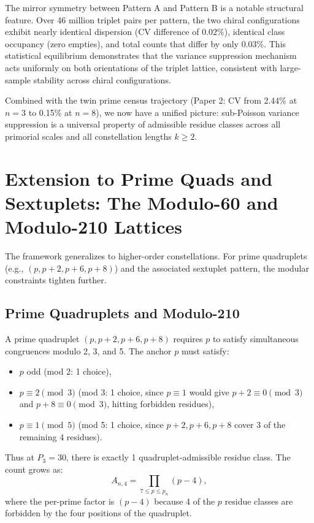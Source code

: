 \documentclass[11pt]{article}
\begin{document}
The mirror symmetry between Pattern A and Pattern B is a notable structural feature. Over 46 million triplet pairs per pattern, the two chiral configurations exhibit nearly identical dispersion (CV difference of $0.02\%$), identical class occupancy (zero empties), and total counts that differ by only $0.03\%$. This statistical equilibrium demonstrates that the variance suppression mechanism acts uniformly on both orientations of the triplet lattice, consistent with large-sample stability across chiral configurations.

Combined with the twin prime census trajectory (Paper 2: CV from 2.44\% at $n=3$ to 0.15\% at $n=8$), we now have a unified picture: sub-Poisson variance suppression is a universal property of admissible residue classes across all primorial scales and all constellation lengths $k \geq 2$.

\section{Extension to Prime Quads and Sextuplets: The Modulo-60 and Modulo-210 Lattices}

The framework generalizes to higher-order constellations. For prime quadruplets (e.g., $(p, p+2, p+6, p+8)$) and the associated sextuplet pattern, the modular constraints tighten further.

\subsection{Prime Quadruplets and Modulo-210}

A prime quadruplet $(p, p+2, p+6, p+8)$ requires $p$ to satisfy simultaneous congruences modulo 2, 3, and 5. The anchor $p$ must satisfy:
\begin{itemize}
  \item $p$ odd (mod 2: 1 choice),
  \item $p \equiv 2 \pmod 3$ (mod 3: 1 choice, since $p \equiv 1$ would give $p+2 \equiv 0 \pmod 3$ and $p+8 \equiv 0 \pmod 3$, hitting forbidden residues),
  \item $p \equiv 1 \pmod 5$ (mod 5: 1 choice, since $p+2, p+6, p+8$ cover 3 of the remaining 4 residues).
\end{itemize}
Thus at $P_3 = 30$, there is exactly 1 quadruplet-admissible residue class. The count grows as:
\begin{equation}
    A_{n,4} = \prod_{7 \le p \le p_n} (p-4),
\end{equation}
where the per-prime factor is $(p-4)$ because 4 of the $p$ residue classes are forbidden by the four positions of the quadruplet.
\end{document}
